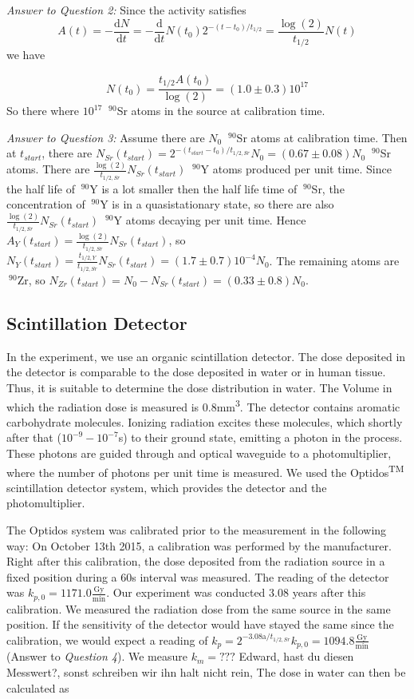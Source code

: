 \documentclass[a4paper,parskip]{scrartcl}
\begin{document}
\textit{Answer to Question 2:} Since the activity satisfies 
$$A(t) = -\frac{\mathrm{d}N}{\mathrm{d}t} = -\frac{\mathrm{d}}{\mathrm{d}t}N(t_0)2^{-(t-t_{0})/t_{1/2}} = \frac{\log(2)}{t_{1/2}}N(t)$$
we have

$$N(t_0) = \frac{t_{1/2}A(t_0)}{\log(2)} = (1.0 \pm 0.3)10^{17}$$
So there where $10^{17}$ $~^{90}$Sr atoms in the source at calibration time.

\textit{Answer to Question 3:} Assume there are $N_0$ $~^{90}$Sr atoms at calibration time. Then at $t_{start}$, there are $N_{Sr}(t_{start}) = 2^{-(t_{start}-t_{0})/t_{1/2,Sr}}N_0 = (0.67 \pm 0.08)N_0$ $~^{90}$Sr atoms. There are $\frac{\log(2)}{t_{1/2,Sr}}N_{Sr}(t_{start})$ $~^{90}$Y atoms produced per unit time. Since the half life of $~^{90}$Y is a lot smaller then the half life time of $~^{90}$Sr, the concentration of $~^{90}$Y is in a quasistationary state, so there are also $\frac{\log(2)}{t_{1/2,Sr}}N_{Sr}(t_{start})$ $~^{90}$Y atoms decaying per unit time. Hence $A_{Y}(t_{start}) = \frac{\log(2)}{t_{1/2,Sr}}N_{Sr}(t_{start})$, so $N_Y(t_{start})=\frac{t_{1/2,Y}}{t_{1/2,Sr}}N_{Sr}(t_{start}) = (1.7 \pm 0.7)10^{-4}N_0$. The remaining atoms are $~^{90}$Zr, so $N_{Zr}(t_{start})=N_0-N_{Sr}(t_{start})=(0.33 \pm 0.8)N_0$.

\subsection{Scintillation Detector}
In the experiment, we use an organic scintillation detector. The dose deposited in the detector is comparable to the dose deposited in water or in human tissue. Thus, it is suitable to determine the dose distribution in water. The Volume in which the radiation dose is measured is 0.8mm\textsuperscript{3}. The detector contains aromatic carbohydrate molecules. Ionizing radiation excites these molecules, which shortly after that ($10^{-9}-10^{-7}$s) to their ground state, emitting a photon in the process. These photons are guided through and optical waveguide to a photomultiplier, where the number of photons per unit time is measured. We used the Optidos\textsuperscript{TM} scintillation detector system, which provides the detector and the photomultiplier.    

The Optidos system was calibrated prior to the measurement in the following way: On October 13th 2015, a calibration was performed by the manufacturer. Right after this calibration, the dose deposited from the radiation source in a fixed position during a 60s interval was measured. The reading of the detector was $k_{p,0}=1171.0\frac{\mathrm{Gy}}{\mathrm{min}}$. Our experiment was conducted $3.08$ years after this calibration. We measured the radiation dose from the same source in the same position. If the sensitivity of the detector would have stayed the same since the calibration, we would expect a reading of $k_p = 2^{-3.08\mathrm{a}/t_{1/2,Sr}}k_{p,0}=1094.8\frac{\mathrm{Gy}}{\mathrm{min}}$ (Answer to \textit{Question 4}). We measure $k_m = ???$ {\color{red} Edward, hast du diesen Messwert?, sonst schreiben wir ihn halt nicht rein}, The dose in water can then be calculated as 
\end{document}

